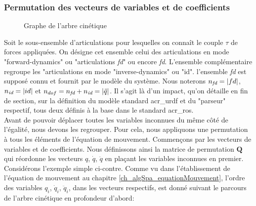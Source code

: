 \documentclass{report}
\begin{document}
\subsubsection{Permutation des vecteurs de variables et de coefficients}

\begin{figure}
  \begin{center}
    \caption{Graphe de l'arbre cinétique}
    \label{fig_chdaArbreK1}
  \end{center}
\end{figure}

Soit le sous-ensemble d'articulations pour lesquelles on connaît le couple $\tau$ de forces appliquées. On désigne cet ensemble celui des articulations en mode "forward-dynamics" ou "articulations \emph{fd}" ou encore \emph{fd}. L'ensemble complémentaire regroupe les "articulations en mode "inverse-dynamics" ou "id". l'ensemble \emph{fd} est supposé connu et fournit par le modèle du système. Nous noterons $n_{\emph{fd}}=\vert fd \vert$, $n_{\emph{id}}=\vert id \vert$ et $n_{dof}=n_{\emph{fd}}+n_{\emph{id}}=\vert \ddot{q} \vert$. Il s'agit là d'un impact, qu'on détaille en fin de section, sur la définition du modèle standard \gls{acr_urdf} et du "parseur" respectif, tous deux définis à la base dans le standard \gls{acr_ros}.\\
Avant de pouvoir déplacer toutes les variables inconnues du même côté de l'égalité, nous devons les regrouper. Pour cela, nous appliquons une permutation à tous les éléments de l'équation de mouvement. Commençons par les vecteurs de variables et de coefficients. Nous définissons ainsi la matrice de permutation $\mathbf{Q}$ qui réordonne les vecteurs $q$, $\dot{q}$, $\ddot{q}$ en plaçant les variables inconnues en premier. Considérons l'exemple simple ci-contre. Comme vu dans l'établissement de l'équation de mouvement au chapitre \ref{ch_algSpa_equationMouvement}, l'ordre des variables $q_i$, $\dot{q}_i$, $\ddot{q}_i$, dans les vecteurs respectifs, est donné suivant le parcours de l'arbre cinétique en profondeur d'abord:
\end{document}
